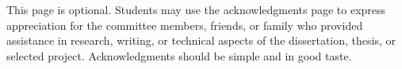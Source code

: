 This page is optional. Students may use the acknowledgments page to express
appreciation for the committee members, friends, or family who provided assistance in research, writing, or technical aspects of the dissertation, thesis, or selected project. Acknowledgments should be simple and in good taste.

